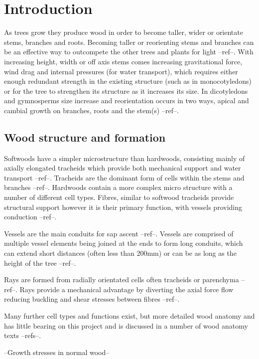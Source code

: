 \documentclass{article}
\begin{document}
\section{Introduction}
As trees grow they produce wood in order to become taller, wider or orientate
stems, branches and roots. Becoming taller or reorienting stems and branches can
be an effective way to outcompete the other trees and plants for light --ref--.
With increasing height, width or off axis stems comes increasing gravitational
force, wind drag and internal pressures (for water transport), which requires
either enough redundant strength in the existing structure (such as in
monocotyledons) or for the tree to strengthen its structure as it increases its
size. In dicotyledons and gymnosperms size increase and reorientation occurs in
two ways, apical and cambial growth on branches, roots and the stem(s) --ref--.

\subsection{Wood structure and formation}
Softwoods have a simpler microstructure than hardwoods, consisting mainly of
axially elongated tracheids which provide both mechanical support and water
transport --ref--. Tracheids are the dominant form of cells within the stems and
branches --ref--. Hardwoods contain a more complex micro structure with a number
of different cell types. Fibres, similar to softwood tracheids provide
structural support however it is their primary function, with vessels providing
conduction --ref--.

Vessels are the main conduits for sap ascent --ref--. Vessels are comprised of
multiple vessel elements being joined at the ends to form long conduits, which
can extend short distances (often less than 200mm) or can be as long as the
height of the tree --ref--.

Rays are formed from radially orientated cells often tracheids or parenchyma
--ref--. Rays provide a mechanical advantage by diverting the axial force flow
reducing buckling and shear stresses between fibres --ref--.

Many further cell types and functions exist, but more detailed wood anatomy and
has little bearing on this project and is discussed in a number of wood anatomy
texts --refs--.

--Growth stresses in normal wood--
\end{document}
